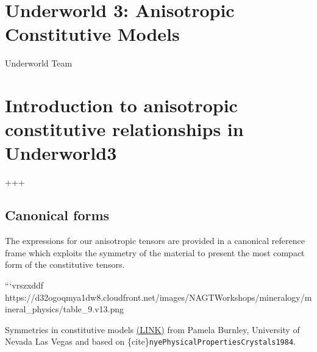 \documentclass[
  letterpaper,
  DIV=11,
  numbers=noendperiod]{scrreprt}
\begin{document}
\chapter{Underworld 3: Anisotropic Constitutive
Models}\label{underworld-3-anisotropic-constitutive-models}

Underworld Team

\hfill\break

\chapter{Introduction to anisotropic constitutive relationships in
Underworld3}\label{introduction-to-anisotropic-constitutive-relationships-in-underworld3}

+++

\section{Canonical forms}\label{canonical-forms}

The expressions for our anisotropic tensors are provided in a canonical
reference frame which exploits the symmetry of the material to present
the most compact form of the constitutive tensors.

```vrszxddf
https://d32ogoqmya1dw8.cloudfront.net/images/NAGTWorkshops/mineralogy/mineral\_physics/table\_9.v13.png

Symmetries in constitutive models
\href{https://serc.carleton.edu/NAGTWorkshops/mineralogy/mineral_physics/tensors.html}{(LINK)}
from Pamela Burnley, University of Nevada Las Vegas and based on
\{cite\}\texttt{nyePhysicalPropertiesCrystals1984}.
\end{document}
